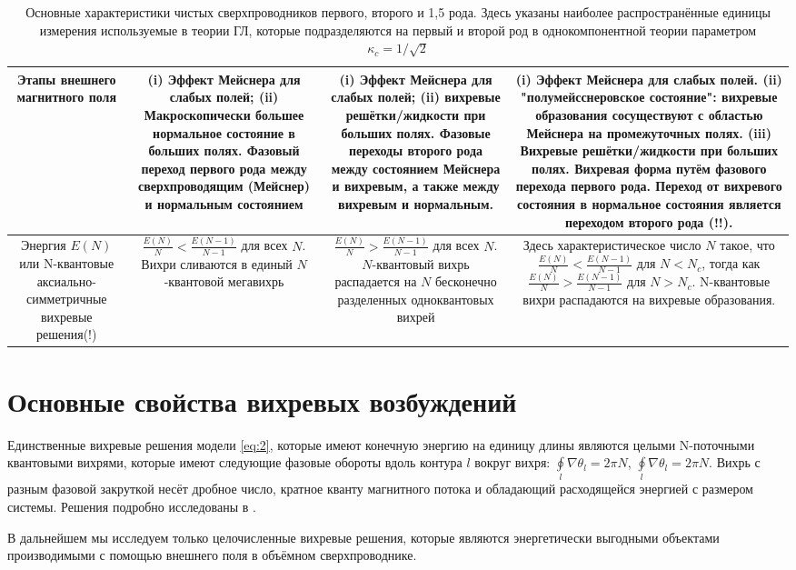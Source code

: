 \begin{table}[ht]
\begin{tabular}{|C{.18}|C{.22}|C{.22}|C{.35}|}
        Этапы внешнего магнитного поля & (i) Эффект Мейснера для слабых полей; 
            (ii) Макроскопически большее нормальное состояние в больших полях. 
            Фазовый переход первого рода между сверхпроводящим (Мейснер) и 
            нормальным состоянием & (i) Эффект Мейснера для слабых полей; (ii) 
            вихревые решётки/жидкости при больших полях. Фазовые переходы 
            второго рода между состоянием Мейснера и вихревым, а также 
            между вихревым и нормальным. & (i) Эффект Мейснера для слабых 
            полей. (ii) "полумейсснеровское состояние": вихревые образования 
            сосуществуют с областью Мейснера на промежуточных полях. (iii) 
            Вихревые решётки/жидкости при больших полях. Вихревая форма путём 
            фазового перехода первого рода. Переход от вихревого состояния в 
            нормальное состояния является переходом второго рода (!!).
        \\ \hline

        Энергия \( E(N) \) или N-квантовые аксиально-симметричные вихревые 
            решения(!) & \( \frac{E(N)}{N} < \frac{E(N-1)}{N-1} \) для всех 
            \( N \). Вихри сливаются в единый \( N \)-квантовой мегавихрь &
        \( \frac{E(N)}{N} > \frac{E(N-1)}{N-1} \) для всех \( N \). 
            \( N \)-квантовый вихрь распадается на \( N \) бесконечно 
            разделенных одноквантовых вихрей & Здесь характеристическое число 
            \( N \) такое, что \( \frac{E(N)}{N} < \frac{E(N-1)}{N-1} \) для 
            \( N < N_c \), тогда как 
            \( \frac{E(N)}{N} > \frac{E(N-1)}{N-1} \) для \( N > N_c \). 
            N-квантовые вихри распадаются на вихревые образования.
        \\ \hline

    \end{tabular}
    \caption{Основные характеристики чистых сверхпроводников первого, второго и 
        1,5 рода. Здесь указаны наиболее распространённые единицы измерения 
        используемые в теории ГЛ, которые подразделяются на первый и второй 
        род в однокомпонентной теории параметром \( \kappa_c = 1/\sqrt{2} \)}
\end{table}

\section{Основные свойства вихревых возбуждений}
\label{sec:2-2}

Единственные вихревые решения модели \eqref{eq:2}, которые имеют конечную 
энергию на единицу длины являются целыми N-поточными квантовыми вихрями, 
которые имеют следующие фазовые обороты вдоль контура \( l \) вокруг вихря: 
\( \oint\limits_l \nabla\theta_l = 2\pi N \), 
\( \oint\limits_l \nabla\theta_l = 2\pi N \). Вихрь с разным фазовой закруткой 
несёт дробное число, кратное кванту магнитного потока и обладающий
расходящейся энергией с размером системы. Решения подробно исследованы в
\cite{bib:22}.

В дальнейшем мы исследуем только целочисленные вихревые решения, которые 
являются энергетически выгодными объектами производимыми с помощью внешнего 
поля в объёмном сверхпроводнике.